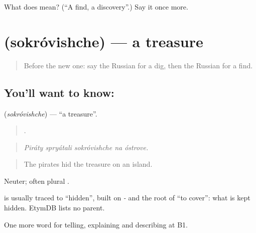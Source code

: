 \begin{tcolorbox}[breakable,colback=teal!4,colframe=teal!35!black,title={Before you move on}]
What does  mean? (\textquotedblleft{}A find, a discovery\textquotedblright{}.) Say it once more.
\end{tcolorbox}
\section[\texorpdfstring{\ru{сокровище} (sokróvishche)}{сокровище (sokróvishche)}]{ (sokróvishche) — a treasure}

\label{lesson:RU-C327-sokrovishche}



\begin{quote}
Before the new one: say the Russian for a dig, then the Russian for a find.
\end{quote}

\subsection*{You'll want to know: }
\textbf{} (\emph{sokróvishche}) — \textquotedblleft{}a treasure\textquotedblright{}.

\begin{quote}
    .
\end{quote}

\begin{quote}
\emph{Piráty spryátali sokróvishche na óstrove.}
\end{quote}

\begin{quote}
The pirates hid the treasure on an island.
\end{quote}

Neuter; often plural \emph{}.

\begin{cousinweb}
\emph{} is usually traced to \emph{} \textquotedblleft{}hidden\textquotedblright{}, built on \emph{-} and the root of \emph{} \textquotedblleft{}to cover\textquotedblright{}: what is kept hidden. EtymDB lists no parent.
\end{cousinweb}

\begin{grammarlens}[title={What you've built}]
One more word for telling, explaining and describing at B1.
\end{grammarlens}

